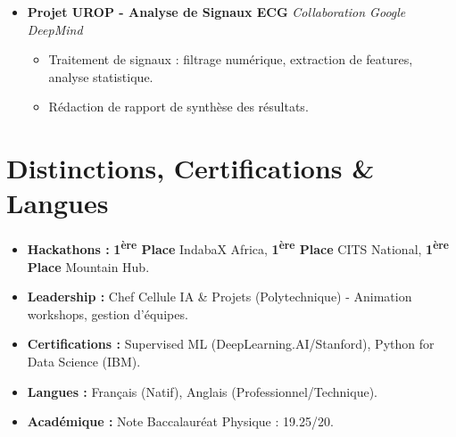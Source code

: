 \documentclass[a4paper,11pt]{article}
\begin{document}
\begin{itemize}[leftmargin=*, label={}]
\item \textbf{Projet UROP - Analyse de Signaux ECG} \hfill \textit{Collaboration Google DeepMind}
\vspace{-2pt}
    \begin{itemize}[leftmargin=0.4cm, nosep, label=\tiny$\bullet$]
        \item \small{Traitement de signaux : filtrage numérique, extraction de features, analyse statistique.}
        \item \small{Rédaction de rapport de synthèse des résultats.}
    \end{itemize}

\end{itemize}

\section{Distinctions, Certifications \& Langues}
\begin{itemize}[leftmargin=*, nosep]
    \item \textbf{Hackathons :} \textbf{1\textsuperscript{ère} Place} IndabaX Africa, \textbf{1\textsuperscript{ère} Place} CITS National, \textbf{1\textsuperscript{ère} Place} Mountain Hub.
    \item \textbf{Leadership :} Chef Cellule IA \& Projets (Polytechnique) - Animation workshops, gestion d'équipes.
    \item \textbf{Certifications :} Supervised ML (DeepLearning.AI/Stanford), Python for Data Science (IBM).
    \item \textbf{Langues :} Français (Natif), Anglais (Professionnel/Technique).
    \item \textbf{Académique :} Note Baccalauréat Physique : 19.25/20.
\end{itemize}
\end{document}
